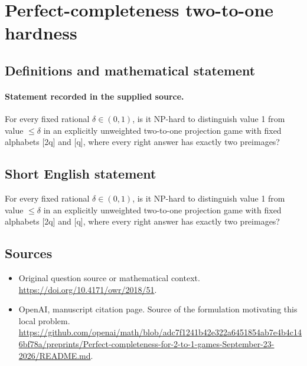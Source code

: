 \documentclass[11pt]{article}
\begin{document}
\section*{Perfect-completeness two-to-one hardness}\label{statement}
\subsection{Definitions and mathematical statement}
\paragraph{Statement recorded in the supplied source.}
For every fixed rational $\delta \in (0,1)$, is it NP-hard to distinguish value 1 from value $\leq \delta $ in an explicitly unweighted two-to-one projection game with fixed alphabets [2q] and [q], where every right answer has exactly two preimages?
\subsection{Short English statement}
For every fixed rational $\delta \in (0,1)$, is it NP-hard to distinguish value 1 from value $\leq \delta $ in an explicitly unweighted two-to-one projection game with fixed alphabets [2q] and [q], where every right answer has exactly two preimages?
\subsection{Sources}
\begin{itemize}
\item[S1] Original question source or mathematical context.
\url{https://doi.org/10.4171/owr/2018/51}.
\item[S2] OpenAI, manuscript citation page. Source of the formulation motivating this local problem.
\url{https://github.com/openai/math/blob/adc7f1241b42e322a6451854ab7e4b4c146bf78a/preprints/Perfect-completeness-for-2-to-1-games-September-23-2026/README.md}.
\end{itemize}
\end{document}
